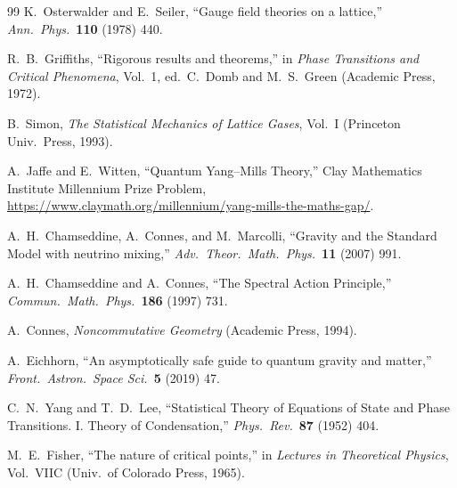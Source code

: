 \documentclass[12pt]{article}
\theoremstyle{definition}
\theoremstyle{remark}
\begin{document}
\begin{thebibliography}{99}
K.~Osterwalder and E.~Seiler,
``Gauge field theories on a lattice,''
\textit{Ann.\ Phys.}\ \textbf{110} (1978) 440.

R.~B.~Griffiths,
``Rigorous results and theorems,''
in \textit{Phase Transitions and Critical Phenomena},
Vol.~1, ed.\ C.~Domb and M.~S.~Green (Academic Press, 1972).

B.~Simon,
\textit{The Statistical Mechanics of Lattice Gases},
Vol.~I (Princeton Univ.\ Press, 1993).

A.~Jaffe and E.~Witten,
``Quantum Yang--Mills Theory,''
Clay Mathematics Institute Millennium Prize Problem,
\url{https://www.claymath.org/millennium/yang-mills-the-maths-gap/}.

A.~H.~Chamseddine, A.~Connes, and M.~Marcolli,
``Gravity and the Standard Model with neutrino mixing,''
\textit{Adv.\ Theor.\ Math.\ Phys.}\ \textbf{11} (2007) 991.

A.~H.~Chamseddine and A.~Connes,
``The Spectral Action Principle,''
\textit{Commun.\ Math.\ Phys.}\ \textbf{186} (1997) 731.

A.~Connes,
\textit{Noncommutative Geometry} (Academic Press, 1994).

A.~Eichhorn,
``An asymptotically safe guide to quantum gravity and matter,''
\textit{Front.\ Astron.\ Space Sci.}\ \textbf{5} (2019) 47.

C.~N.~Yang and T.~D.~Lee,
``Statistical Theory of Equations of State and Phase Transitions.
I. Theory of Condensation,''
\textit{Phys.\ Rev.}\ \textbf{87} (1952) 404.

M.~E.~Fisher,
``The nature of critical points,''
in \textit{Lectures in Theoretical Physics}, Vol.~VIIC
(Univ.\ of Colorado Press, 1965).

\end{thebibliography}
\end{document}
